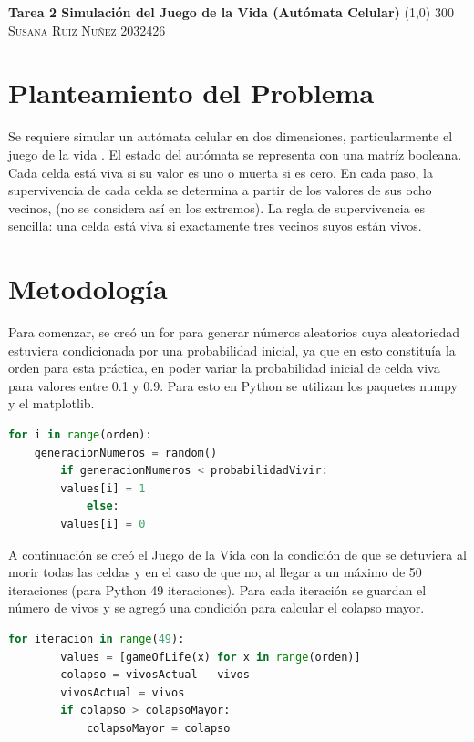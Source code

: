 \documentclass{article}
\begin{document}
	\begin{center}
	\huge{\textbf{Tarea 2 Simulación del Juego de la Vida (Autómata Celular)}}
	\line(1,0) {300}\\
	
	\textsc{ \Large Susana Ruiz Nuñez} 
	\textsc{ \Large 2032426}
	\end{center}


\section{Planteamiento del Problema} 
Se requiere simular un autómata celular en dos dimensiones, particularmente el juego de la vida \cite{satu}. El estado del autómata se representa con una matríz booleana. Cada celda está viva si su valor es uno o muerta si es cero. En cada paso, la supervivencia de cada celda se determina a partir de los valores de sus ocho vecinos, (no se considera así en los extremos). La regla de supervivencia es sencilla: una celda está viva si exactamente tres vecinos suyos están vivos. 

\section{Metodología}
Para comenzar, se creó un for para generar números aleatorios cuya aleatoriedad estuviera condicionada por una probabilidad inicial, ya que en esto constituía la orden para esta práctica, en poder variar la probabilidad inicial de celda viva para valores entre 0.1 y 0.9. Para esto en Python se utilizan los paquetes numpy y el matplotlib. 
  
\begin{lstlisting}[language=Python]
	for i in range(orden):
	generacionNumeros = random()
		if generacionNumeros < probabilidadVivir:
		values[i] = 1
			else:
		values[i] = 0
\end{lstlisting}

A continuación se creó el Juego de la Vida \cite{satu} con la condición de que se detuviera al morir todas las celdas y en el caso de que no, al llegar a un máximo de 50 iteraciones (para Python 49 iteraciones). Para cada iteración se guardan el número de vivos y se agregó una condición para calcular el colapso mayor. 
\begin{lstlisting}[language=Python]
	for iteracion in range(49):
		values = [gameOfLife(x) for x in range(orden)]
		colapso = vivosActual - vivos
		vivosActual = vivos
		if colapso > colapsoMayor:
			colapsoMayor = colapso
\end{lstlisting}
     
\end{document}
